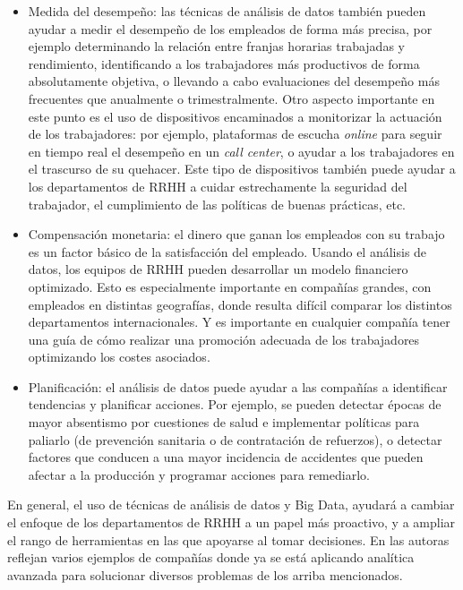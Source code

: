 \begin{itemize}
\item Medida del desempeño: las técnicas de análisis de datos también pueden ayudar a medir
el desempeño de los empleados de forma más precisa, por ejemplo determinando la relación entre 
franjas horarias trabajadas y rendimiento, identificando a los trabajadores más productivos de
forma absolutamente objetiva, o llevando a cabo evaluaciones del desempeño
más frecuentes que anualmente o trimestralmente. Otro aspecto importante en este punto es el uso de dispositivos 
encaminados a monitorizar la actuación de los trabajadores: por ejemplo, plataformas de escucha 
{\em online} para seguir en tiempo real el desempeño en un {\em call center}, o ayudar a los trabajadores
en el trascurso de su quehacer. Este tipo de dispositivos también puede ayudar a los departamentos
de RRHH a cuidar estrechamente la seguridad del trabajador, el cumplimiento de las políticas
de buenas prácticas, etc.

\item Compensación monetaria: el dinero que ganan los empleados con su trabajo es un
factor básico de la satisfacción del empleado. Usando el análisis de datos, los equipos de 
RRHH pueden desarrollar un modelo financiero optimizado. Esto es especialmente importante
en compañías grandes, con empleados en distintas geografías, donde resulta difícil comparar 
los distintos departamentos internacionales. Y es importante en cualquier compañía tener
una guía de cómo realizar una promoción adecuada de los trabajadores optimizando
los costes asociados.

\item Planificación: el análisis de datos puede ayudar a las compañías a identificar tendencias y 
pla\-ni\-ficar acciones. Por ejemplo, se pueden detectar épocas de mayor absentismo por cuestiones de 
salud e implementar políticas para paliarlo (de prevención sanitaria o de contratación de refuerzos), o 
detectar factores que conducen a una mayor incidencia de accidentes que pueden afectar a la producción
y programar acciones para remediarlo.

\end{itemize}

En general, el uso de técnicas de análisis de datos y Big Data, ayudará a cambiar el enfoque
de los departamentos de RRHH a un papel más proactivo, y a ampliar el rango de herramientas en las
que apoyarse al tomar decisiones. En \cite{talent_an} las autoras reflejan varios ejemplos
de compañías donde ya se está aplicando analítica avanzada para solucionar diversos problemas
de los arriba mencionados.

